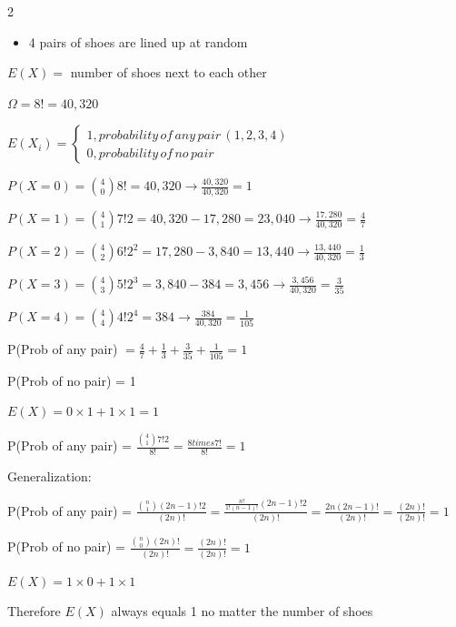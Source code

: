 \documentclass[12 pt]{article}
\begin{document}
    \begin{exercise}{2}
    \hfill

    \begin{itemize}
        \item 4 pairs of shoes are lined up at random
    \end{itemize}

    \hfill

    $E(X) =$ number of shoes next to each other

    $\Omega = 8! = 40,320$

    $E(X_i) = \begin{cases}
        1, probability \, of \, any \, pair \, (1,2,3,4) \\
        0, probability \, of \, no \, pair
    \end{cases}$

    $P(X=0) = \binom{4}{0}8!  = 40,320 \xrightarrow{} \frac{40,320}{40,320} = 1$

    $P(X=1) = \binom{4}{1}7!2 = 40,320 - 17,280 = 23,040 \xrightarrow{} \frac{17,280}{40,320} = \frac{4}{7}$

    $P(X=2) = \binom{4}{2}6!2^2 = 17,280 - 3,840 = 13,440 \xrightarrow{} \frac{13,440}{40,320} = \frac{1}{3}$

    $P(X=3) = \binom{4}{3}5!2^3 = 3,840 - 384 = 3,456 \xrightarrow{} \frac{3,456}{40,320} = \frac{3}{35}$

    $P(X=4) = \binom{4}{4}4!2^4 = 384 \xrightarrow{} \frac{384}{40,320} = \frac{1}{105}$

    \hfill

    P(Prob of any pair) $ = \frac{4}{7} + \frac{1}{3} + \frac{3}{35} + \frac{1}{105} = 1$

    P(Prob of no pair) = 1

    \hfill

    $E(X) = 0 \times 1 + 1 \times 1 = 1$

    \hfill

    P(Prob of any pair) = $\frac{\binom{4}{1}7!2}{8!} = \frac{8 times 7!}{8!} = 1$

    Generalization:

    P(Prob of any pair) = $\frac{\binom{n}{1}(2n-1)!2}{(2n)!} = \frac{\frac{n!}{1!(n-1)!}(2n-1)!2}{(2n)!} = \frac{2n(2n-1)!}{(2n)!} = \frac{(2n)!}{(2n)!} = 1$

    P(Prob of no pair) = $\frac{\binom{n}{0}(2n)!}{(2n)!} = \frac{(2n)!}{(2n)!} = 1$

    $E(X) =  1 \times 0 + 1 \times 1$

    Therefore $E(X)$ always equals 1 no matter the number of shoes

    \hfill    
    \end{exercise}
\end{document}

